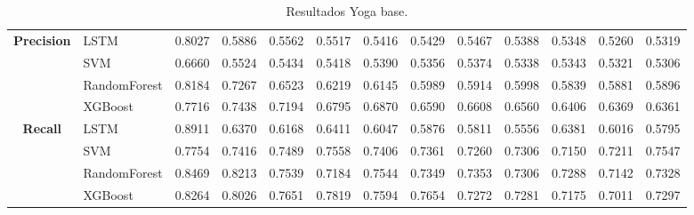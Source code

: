 \begin{table}[h]
\begin{adjustbox}{max width=15cm}
\begin{tabular}{|c|l|r|r|r|r|r|r|r|r|r|r|r|}
			\hline
			\textbf{Precision} & LSTM &  0.8027 &  0.5886 &  0.5562 &  0.5517 &  0.5416 &  0.5429 &  0.5467 &  0.5388 &  0.5348 &  0.5260 &  0.5319 \\
			& SVM &  0.6660 &  0.5524 &  0.5434 &  0.5418 &  0.5390 &  0.5356 &  0.5374 &  0.5338 &  0.5343 &  0.5321 &  0.5306 \\
			& RandomForest &  0.8184 &  0.7267 &  0.6523 &  0.6219 &  0.6145 &  0.5989 &  0.5914 &  0.5998 &  0.5839 &  0.5881 &  0.5896 \\
			& XGBoost &  0.7716 &  0.7438 &  0.7194 &  0.6795 &  0.6870 &  0.6590 &  0.6608 &  0.6560 &  0.6406 &  0.6369 &  0.6361 \\
			\hline
			\textbf{Recall} & LSTM &  0.8911 &  0.6370 &  0.6168 &  0.6411 &  0.6047 &  0.5876 &  0.5811 &  0.5556 &  0.6381 &  0.6016 &  0.5795 \\
			& SVM &  0.7754 &  0.7416 &  0.7489 &  0.7558 &  0.7406 &  0.7361 &  0.7260 &  0.7306 &  0.7150 &  0.7211 &  0.7547 \\
			& RandomForest &  0.8469 &  0.8213 &  0.7539 &  0.7184 &  0.7544 &  0.7349 &  0.7353 &  0.7306 &  0.7288 &  0.7142 &  0.7328 \\
			& XGBoost &  0.8264 &  0.8026 &  0.7651 &  0.7819 &  0.7594 &  0.7654 &  0.7272 &  0.7281 &  0.7175 &  0.7011 &  0.7297 \\
			\hline
		\end{tabular}
	\end{adjustbox}
	\caption{Resultados Yoga base.}
	\label{tab:Yoga_base}
\end{table}
